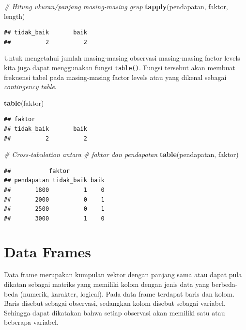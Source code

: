 \documentclass[]{book}
\newenvironment{Shaded}{\begin{snugshade}}{\end{snugshade}}
\newcommand{\KeywordTok}[1]{\textcolor[rgb]{0.13,0.29,0.53}{\textbf{#1}}}
\newcommand{\CommentTok}[1]{\textcolor[rgb]{0.56,0.35,0.01}{\textit{#1}}}
\newcommand{\NormalTok}[1]{#1}
\begin{document}
\begin{Shaded}
\begin{Highlighting}[]
\CommentTok{# Hitung ukuran/panjang masing-masing grup}
\KeywordTok{tapply}\NormalTok{(pendapatan, faktor, length)}
\end{Highlighting}
\end{Shaded}

\begin{verbatim}
## tidak_baik       baik 
##          2          2
\end{verbatim}

Untuk mengetahui jumlah masing-masing observasi masing-masing factor
levels kita juga dapat menggunakan fungsi \texttt{table()}. Fungsi
tersebut akan membuat frekuensi tabel pada masing-masing factor levels
atau yang dikenal sebagai \emph{contingency table}.

\begin{Shaded}
\begin{Highlighting}[]
\KeywordTok{table}\NormalTok{(faktor)}
\end{Highlighting}
\end{Shaded}

\begin{verbatim}
## faktor
## tidak_baik       baik 
##          2          2
\end{verbatim}

\begin{Shaded}
\begin{Highlighting}[]
\CommentTok{# Cross-tabulation antara}
\CommentTok{# faktor dan pendapatan}
\KeywordTok{table}\NormalTok{(pendapatan, faktor)}
\end{Highlighting}
\end{Shaded}

\begin{verbatim}
##           faktor
## pendapatan tidak_baik baik
##       1800          1    0
##       2000          0    1
##       2500          0    1
##       3000          1    0
\end{verbatim}

\section{Data Frames}\label{data-frames}

Data frame merupakan kumpulan vektor dengan panjang sama atau dapat pula
dikatan sebagai matriks yang memiliki kolom dengan jenis data yang
berbeda-beda (numerik, karakter, logical). Pada data frame terdapat
baris dan kolom. Baris disebut sebagai observasi, sedangkan kolom
disebut sebagai variabel. Sehingga dapat dikatakan bahwa setiap
observasi akan memiliki satu atau beberapa variabel.
\end{document}
